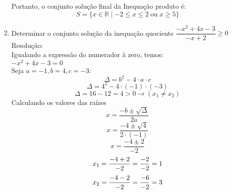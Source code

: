 \begin{enumerate}
	Portanto, o conjunto solução final da Inequação produto é: 
	\[
	S = \{ x \in \mathbb{R} \mid -2 \le x \le 2 \; \text{ou} \; x \ge 5 \}
	\]
	
    \item Determinar o conjunto solução da inequação quociente $ \dfrac{-x^2+4x-3}{-x+2} \ge 0$\\

    \noindent
	Resolução:\\
	
	Igualando a expressão do numerador à zero, temos:\\
	$ -x^2+4x-3 = 0$\\
	Seja $a=-1, b=4, c=-3$:\\
	\[
	\Delta = b^2 - 4 \cdot a \cdot c
	\]
	\[
	\Delta = 4^2 - 4 \cdot (-1) \cdot (-3)
	\]
	\[
	\Delta = 16 - 12 = 4 > 0 \longrightarrow (x_1 \neq x_2)
	\]
	Calculando os valores das raízes
	\[
	x = \dfrac{-b \pm \sqrt{ \Delta}}{2a}
	\]
	\[
	x = \dfrac{-4 \pm \sqrt{4}}{2 \cdot (-1)}
	\]
	\[
	x = \dfrac{-4 \pm 2}{-2} 
	\]
	\[
	x_1 = \dfrac{-4 + 2}{-2} =\dfrac{-2}{-2} = 1\\
	\]
	\[
	x_2 = \dfrac{-4 - 2}{-2} =\dfrac{-6}{-2} = 3\\
	\]

        \begin{center}
    \end{center}
 

\end{enumerate}

